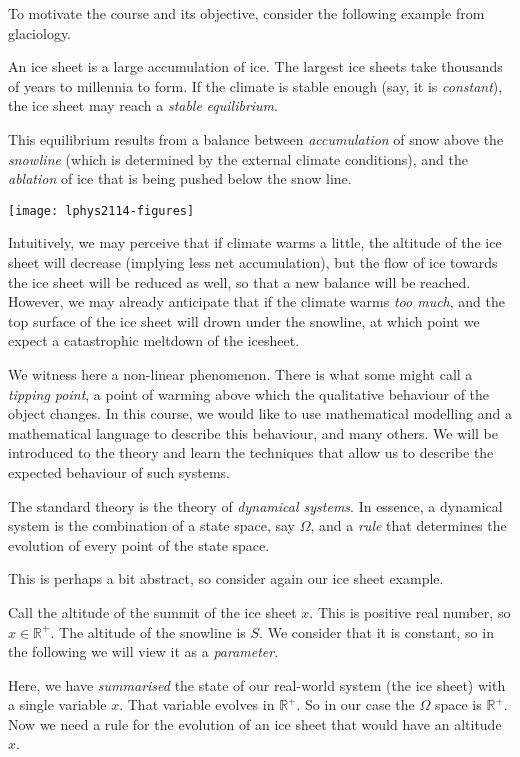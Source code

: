 To motivate the course and its objective, consider the following example
from glaciology.

An ice sheet is a large accumulation of ice. The largest ice sheets take
thousands of years to millennia to form. If the climate is stable enough
(say, it is \emph{constant}), the ice sheet may reach a \emph{stable}
\emph{equilibrium}.

This equilibrium results from a balance between \emph{accumulation} of
snow above the \emph{snowline} (which is determined by the external
climate conditions), and the \emph{ablation} of ice that is being pushed
below the snow line.

\texttt{[image: lphys2114-figures]}

Intuitively, we may perceive that if climate warms a little, the
altitude of the ice sheet will decrease (implying less net
accumulation), but the flow of ice towards the ice sheet will be reduced
as well, so that a new balance will be reached. However, we may already
anticipate that if the climate warms \emph{too much}, and the top
surface of the ice sheet will drown under the snowline, at which point
we expect a catastrophic meltdown of the icesheet.

We witness here a non-linear phenomenon. There is what some might call a
\emph{tipping point}, a point of warming above which the qualitative
behaviour of the object changes. In this course, we would like to use
mathematical modelling and a mathematical language to describe this
behaviour, and many others. We will be introduced to the theory and
learn the techniques that allow us to describe the expected behaviour of
such systems.

The standard theory is the theory of \emph{dynamical systems}. In
essence, a dynamical system is the combination of a state space, say
\(\Omega\), and a \emph{rule} that determines the evolution of every
point of the state space.

This is perhaps a bit abstract, so consider again our ice sheet example.

Call the altitude of the summit of the ice sheet \(x\). This is positive
real number, so \(x \in \mathbb{R}^+\). The altitude of the snowline is
\(S\). We consider that it is constant, so in the following we will view
it as a \emph{parameter}.

Here, we have \emph{summarised} the state of our real-world system (the
ice sheet) with a single variable \(x\). That variable evolves in
\(\mathbb{R}^+\). So in our case the \(\Omega\) space is
\(\mathbb{R}^+\). Now we need a rule for the evolution of an ice sheet
that would have an altitude \(x\).

